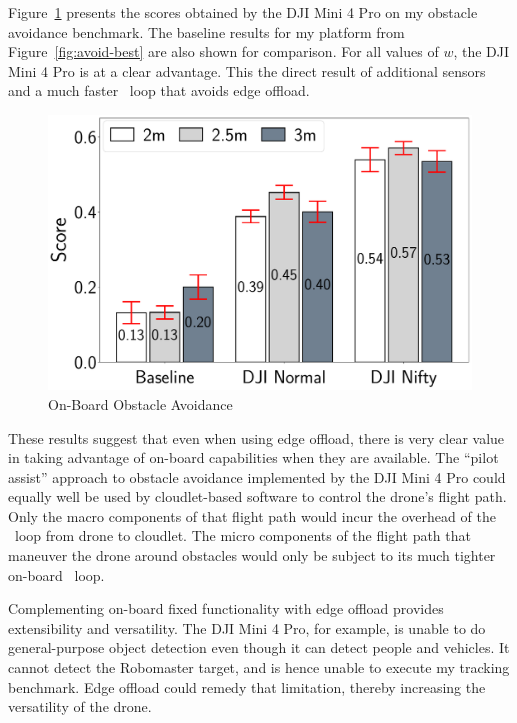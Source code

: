 Figure~\ref{fig:avoidance_dji} presents the scores obtained by the DJI
Mini 4 Pro  on my obstacle avoidance benchmark.  The baseline results
for my platform from Figure~\ref{fig:avoid-best} are also shown for
comparison.  For all values of $w$, the DJI Mini 4 Pro  is at a clear
advantage.  This the direct result of additional sensors and a much
faster \ooda~loop that avoids edge offload.

\begin{figure}
\centering
\includegraphics[width=0.8\linewidth]{chapter6/FIGS/fig-avoidance-dji.pdf}
\caption{On-Board Obstacle Avoidance}
\label{fig:avoidance_dji}
\end{figure}

These results suggest that even when using edge offload, there is very
clear value in taking advantage of on-board capabilities when they are
available.  The ``pilot assist'' approach to obstacle avoidance
implemented by the DJI Mini 4 Pro could equally well be used by
cloudlet-based software to control the drone's flight path.  Only the
macro components of that flight path would incur the overhead of the
\ooda~loop from drone to cloudlet.  The micro components of the flight
path that maneuver the drone around obstacles would only be subject to
its much tighter on-board \ooda~loop.

Complementing on-board fixed functionality with edge offload provides
extensibility and versatility.  The DJI Mini 4 Pro, for example, is
unable to do general-purpose object detection even though it can
detect people and vehicles.  It cannot detect the Robomaster target, and is hence
unable to execute my tracking benchmark.  Edge offload could remedy
that limitation, thereby increasing the versatility of the drone.

